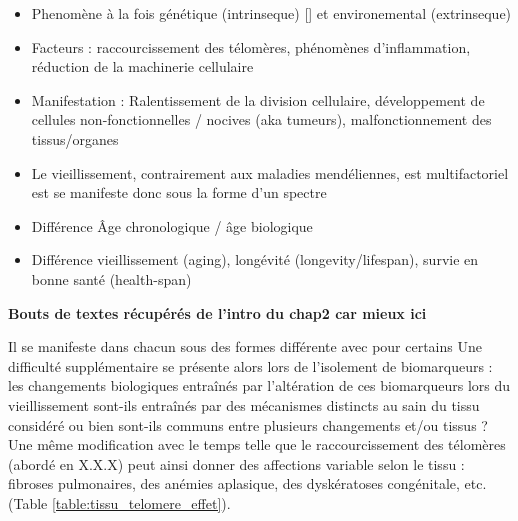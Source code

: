 \begin{itemize}
    \item Phenomène à la fois génétique (intrinseque) [] et environemental (extrinseque) 
    \item Facteurs : raccourcissement des télomères, phénomènes d'inflammation, réduction de la machinerie cellulaire
    \item Manifestation : Ralentissement de la division cellulaire, développement de cellules non-fonctionnelles / nocives (aka tumeurs), malfonctionnement des tissus/organes
    \item Le vieillissement, contrairement aux maladies mendéliennes, est multifactoriel est se manifeste donc sous la forme d'un spectre
    \item Différence Âge chronologique / âge biologique
    \item Différence vieillissement (aging), longévité (longevity/lifespan), survie en bonne santé (health-span) 
\end{itemize}

\textbf{Bouts de textes récupérés de l'intro du chap2 car mieux ici}

Il se manifeste dans chacun sous des formes  différente avec pour certains
Une difficulté supplémentaire se présente alors lors de l'isolement de biomarqueurs : les changements biologiques entraînés par l'altération de ces biomarqueurs lors du vieillissement sont-ils 
entraînés par des mécanismes distincts au sain du tissu considéré ou bien sont-ils communs entre plusieurs changements et/ou tissus ?
Une même modification avec le temps telle que le raccourcissement des télomères (abordé en X.X.X) peut ainsi donner des affections variable selon le tissu : fibroses pulmonaires, des anémies aplasique, des dyskératoses congénitale, etc. \cite{Armanios2012} (Table \ref{table:tissu_telomere_effet}). 

